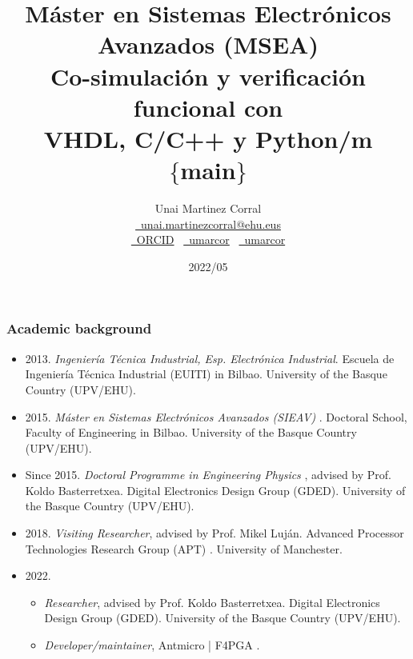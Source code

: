 \documentclass{beamer}
\title{\small Máster en Sistemas Electrónicos Avanzados (MSEA)\\\Large Co-simulación y verificación funcional con\\VHDL, C/C++ y Python/m\\{\small $\{$main$\}$}}
\author{Unai Martinez Corral\\\href{mailto:unai.martinezcorral@ehu.eus}{\faEnvelope~unai.martinezcorral@ehu.eus}\\\href{https://orcid.org/0000-0003-1752-9181}{\faGlobe~ORCID} ~\href{https://github.com/umarcor}{\faGithub~umarcor} ~\href{https://gitlab.com/umarcor}{\faGitlab~umarcor}}
\institute{Escuela de Ingeniería de Bilbao\\Universidad del País Vasco/Euskal Herriko Unibertsitatea (UPV/EHU)}
\date{2022/05}
\begin{document}
\frame{\titlepage}

\begin{frame}
\frametitle{Academic background}
\small
\vfill
\begin{itemize}
\item
  2013.
  \emph{Ingeniería Técnica Industrial, Esp. Electrónica Industrial}.
  \tiny
  Escuela de Ingeniería Técnica Industrial (EUITI) in Bilbao.
  University of the Basque Country (UPV/EHU).
  \small

\vfill

\item
  2015.
  \emph{Máster en Sistemas Electrónicos Avanzados (SIEAV)} \href{https://www.ehu.eus/es/web/master/master-sistemas-electronicos-avanzados}{\faGlobe}.
  \tiny
  Doctoral School, Faculty of Engineering in Bilbao.
  University of the Basque Country (UPV/EHU).
  \small

\vfill

\item
  Since 2015.
  \emph{Doctoral Programme in Engineering Physics} \href{https://www.ehu.eus/en/web/doktoregoak/doctorate-engineering-physics}{\faGlobe},
  advised by Prof. Koldo Basterretxea.
  \tiny
  Digital Electronics Design Group (GDED).
  University of the Basque Country (UPV/EHU).
  \small

\vfill

\item
  2018.
  \emph{Visiting Researcher},
  advised by Prof. Mikel Luján.
  \tiny
  Advanced Processor Technologies Research Group (APT) \href{http://apt.cs.manchester.ac.uk/}{\faGlobe}.
  University of Manchester.
  \small

\item
  2022.
  \begin{itemize}
    \item \emph{Researcher},
  advised by Prof. Koldo Basterretxea.
  \tiny
  Digital Electronics Design Group (GDED).
  University of the Basque Country (UPV/EHU).
  \small

  \item \emph{Developer/maintainer},
  Antmicro \href{https://antmicro.com/}{\faGlobe} | F4PGA \href{https://f4pga.org/}{\faGlobe}.
  \end{itemize}
\end{itemize}
\vfill
\end{frame}
\end{document}
